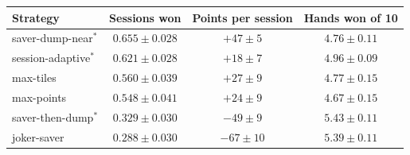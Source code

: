 \begin{tabular}{@{}lccc@{}}\toprule
Strategy & Sessions won & Points per session & Hands won of 10\\\midrule
saver-dump-near$^*$ & $0.655\pm0.028$ & $+47\pm5$ & $4.76\pm0.11$ \\
session-adaptive$^*$ & $0.621\pm0.028$ & $+18\pm7$ & $4.96\pm0.09$ \\
max-tiles & $0.560\pm0.039$ & $+27\pm9$ & $4.77\pm0.15$ \\
max-points & $0.548\pm0.041$ & $+24\pm9$ & $4.67\pm0.15$ \\
saver-then-dump$^*$ & $0.329\pm0.030$ & $-49\pm9$ & $5.43\pm0.11$ \\
joker-saver & $0.288\pm0.030$ & $-67\pm10$ & $5.39\pm0.11$ \\
\bottomrule
\end{tabular}
